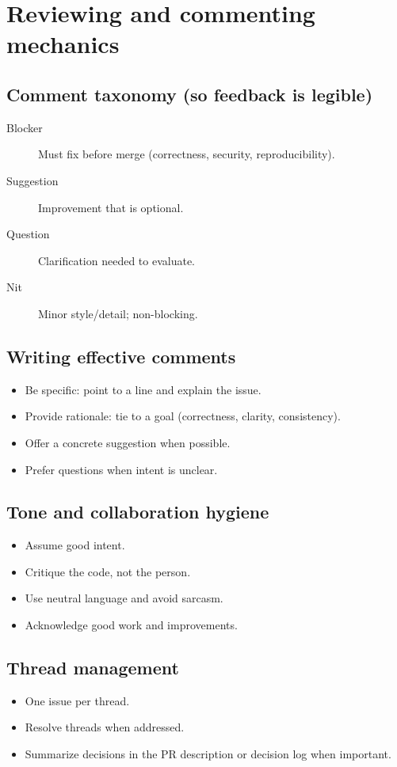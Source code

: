 \section{Reviewing and commenting mechanics}
\subsection{Comment taxonomy (so feedback is legible)}
\begin{description}
\item[Blocker] Must fix before merge (correctness, security, reproducibility).
\item[Suggestion] Improvement that is optional.
\item[Question] Clarification needed to evaluate.
\item[Nit] Minor style/detail; non-blocking.
\end{description}

\subsection{Writing effective comments}
\begin{itemize}
\item Be specific: point to a line and explain the issue.
\item Provide rationale: tie to a goal (correctness, clarity, consistency).
\item Offer a concrete suggestion when possible.
\item Prefer questions when intent is unclear.
\end{itemize}

\subsection{Tone and collaboration hygiene}
\begin{itemize}
\item Assume good intent.
\item Critique the code, not the person.
\item Use neutral language and avoid sarcasm.
\item Acknowledge good work and improvements.
\end{itemize}

\subsection{Thread management}
\begin{itemize}
\item One issue per thread.
\item Resolve threads when addressed.
\item Summarize decisions in the PR description or decision log when important.
\end{itemize}

